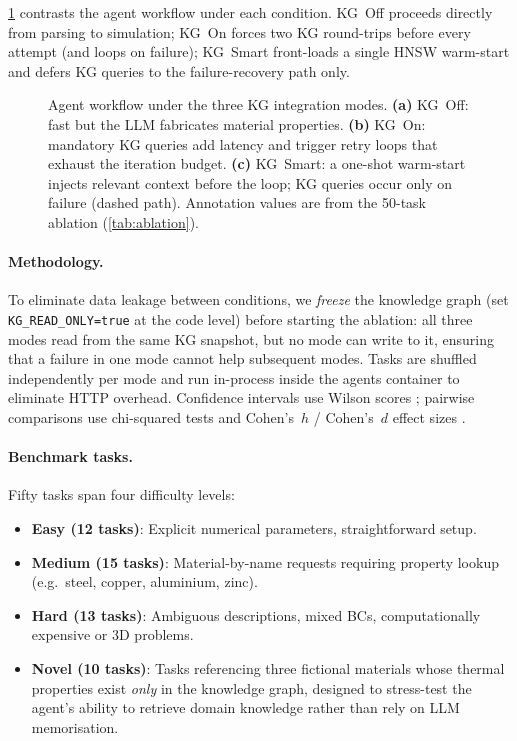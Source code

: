 \documentclass[twocolumn]{article}
\begin{document}
\cref{fig:kg-modes} contrasts the agent workflow under each condition.
KG~Off proceeds directly from parsing to simulation; KG~On forces two
KG round-trips before every attempt (and loops on failure); KG~Smart
front-loads a single HNSW warm-start and defers KG queries to the
failure-recovery path only.

\begin{figure}[htbp]
  \centering
  \resizebox{0.92\textwidth}{!}{}
  \caption{Agent workflow under the three KG integration modes.
    \textbf{(a)} KG~Off: fast but the LLM fabricates material properties.
    \textbf{(b)} KG~On: mandatory KG queries add latency and trigger
    retry loops that exhaust the iteration budget.
    \textbf{(c)} KG~Smart: a one-shot warm-start injects relevant context
    before the loop; KG queries occur only on failure (dashed path).
    Annotation values are from the 50-task ablation (\cref{tab:ablation}).}
  \label{fig:kg-modes}
\end{figure}

\paragraph{Methodology.}
To eliminate data leakage between conditions, we \emph{freeze} the
knowledge graph (set \texttt{KG\_READ\_ONLY=true} at the code level)
before starting the ablation: all three modes read from the same KG
snapshot, but no mode can write to it, ensuring that a failure in one
mode cannot help subsequent modes.
Tasks are shuffled independently per mode and run in-process inside the
agents container to eliminate HTTP overhead.
Confidence intervals use Wilson scores \citep{wilson1927}; pairwise
comparisons use chi-squared tests and Cohen's~$h$ / Cohen's~$d$ effect
sizes \citep{cohen1988}.

\paragraph{Benchmark tasks.}
Fifty tasks span four difficulty levels:
\begin{itemize}
  \item \textbf{Easy (12 tasks)}: Explicit numerical parameters, straightforward setup.
  \item \textbf{Medium (15 tasks)}: Material-by-name requests requiring
        property lookup (e.g.\ steel, copper, aluminium, zinc).
  \item \textbf{Hard (13 tasks)}: Ambiguous descriptions, mixed BCs,
        computationally expensive or 3D problems.
  \item \textbf{Novel (10 tasks)}: Tasks referencing three fictional
        materials whose thermal properties exist \emph{only} in the
        knowledge graph, designed to stress-test the agent's ability
        to retrieve domain knowledge rather than rely on LLM memorisation.
\end{itemize}
\end{document}

